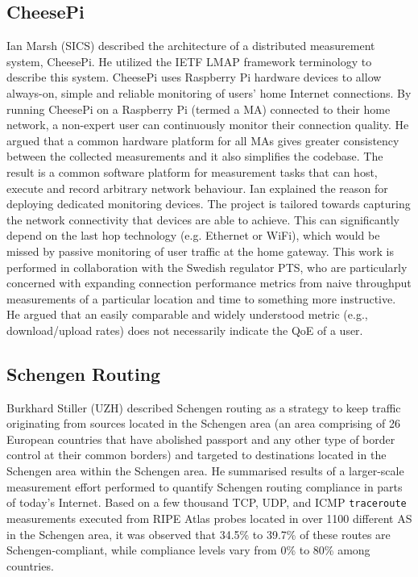 \subsection{CheesePi}

Ian Marsh (SICS) described the architecture of a distributed measurement
system, CheesePi. He utilized the IETF LMAP framework \cite{rfc7594}
terminology to describe this system.  CheesePi uses Raspberry Pi hardware
devices to allow always-on, simple and reliable monitoring of users’ home
Internet connections. By running CheesePi on a Raspberry Pi (termed a \ac{MA})
connected to their home network, a non-expert user can continuously monitor
their connection quality. He argued that a common hardware platform for all
\ac{MA}s gives greater consistency between the collected measurements and it
also simplifies the codebase. The result is a common software platform for
measurement tasks that can host, execute and record arbitrary network
behaviour. Ian explained the reason for deploying dedicated monitoring
devices. The project is tailored towards capturing the network connectivity
that devices are able to achieve. This can significantly depend on the last
hop technology (e.g. Ethernet or WiFi), which would be missed by passive
monitoring of user traffic at the home gateway.  This work is performed in
collaboration with the Swedish regulator \ac{PTS}, who are particularly
concerned with expanding connection performance metrics from naive throughput
measurements of a particular location and time to something more instructive.
He argued that an easily comparable and widely understood metric (e.g.,
download/upload rates) does not necessarily indicate the \ac{QoE} of a user.

\subsection{Schengen Routing}

Burkhard Stiller (UZH) described Schengen routing as a strategy to keep
traffic originating from sources located in the Schengen area (an area
comprising of 26 European countries that have abolished passport and any other
type of border control at their common borders)  and targeted to destinations
located in the Schengen area within the Schengen area. He summarised results
of a larger-scale measurement effort \cite{bstiller:aims:2015} performed to
quantify Schengen routing compliance in parts of today's Internet. Based on a
few thousand TCP, UDP, and ICMP \texttt{traceroute} measurements executed from
RIPE Atlas probes located in over 1100 different \ac{AS} in the Schengen area,
it was observed that 34.5\% to 39.7\% of these routes are Schengen-compliant,
while compliance levels vary from 0\% to 80\% among countries.

